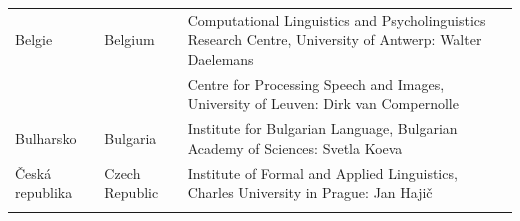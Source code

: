 \vfill

\cleardoublepage

\appendix
{}

{} %



\cleardoublepage

{} %
\label{metanetmembers}

\small
\begin{longtable}{@{}llp{113mm}@{}}
  Belgie & \textcolor{grey1}{Belgium} & Computational Linguistics and Psycholinguistics Research Centre, University of Antwerp: Walter Daelemans\\ \addlinespace
  & & Centre for Processing Speech and Images, University of Leuven: Dirk van Compernolle \\ \addlinespace
  Bulharsko & \textcolor{grey1}{Bulgaria} & Institute for Bulgarian Language, Bulgarian Academy of Sciences: Svetla Koeva \\ \addlinespace
  
  Česká republika & \textcolor{grey1}{Czech Republic} & Institute of Formal and Applied Linguistics, Charles University in Prague: Jan Hajič \\ \addlinespace 
 

\end{longtable}
